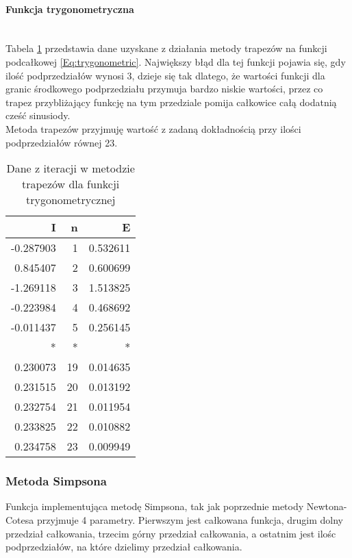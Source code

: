 \documentclass[12pt,twoside]{article}
\begin{document}
\paragraph{Funkcja trygonometryczna}\mbox{} \\

Tabela \ref{tabela2.2} przedstawia dane uzyskane z działania metody trapezów na funkcji podcałkowej \eqref{Eq:trygonometric}. Największy błąd dla tej funkcji pojawia się, gdy ilość podprzedziałów wynosi 3, dzieje się tak dlatego, że wartości funkcji dla granic środkowego podprzedziału przymuja bardzo niskie wartości, przez co trapez przybliżający funkcję na tym przedziale pomija całkowice całą dodatnią cześć sinusiody.\\
Metoda trapezów przyjmuję wartość z zadaną dokładnością przy ilości podprzedziałów równej 23.


\begin{table}[h!]
\centering 
\caption{Dane z iteracji w metodzie trapezów dla funkcji trygonometrycznej}
\label{tabela2.2}
\begin{tabular}{rrr}
\toprule
I &  n &      E \\
\midrule
-0.287903 &       1 & 0.532611 \\
0.845407 &       2 &  0.600699 \\
-1.269118 &       3 & 1.513825 \\
-0.223984 &       4 & 0.468692 \\
-0.011437 &       5 & 0.256145 \\
 *&       * & * \\
0.230073 &      19 & 0.014635 \\
0.231515 &      20 & 0.013192 \\
0.232754 &      21 & 0.011954 \\
0.233825 &      22 & 0.010882 \\
0.234758 &      23 & 0.009949 \\
\bottomrule
\end{tabular}
\end{table}


\subsubsection{Metoda Simpsona}

Funkcja implementująca metodę Simpsona, tak jak poprzednie metody Newtona-Cotesa przyjmuje 4 parametry. Pierwszym jest całkowana funkcja, drugim dolny przedział całkowania, trzecim górny przedział całkowania, a ostatnim jest ilośc podprzedziałów, na które dzielimy przedział całkowania.
\end{document}
